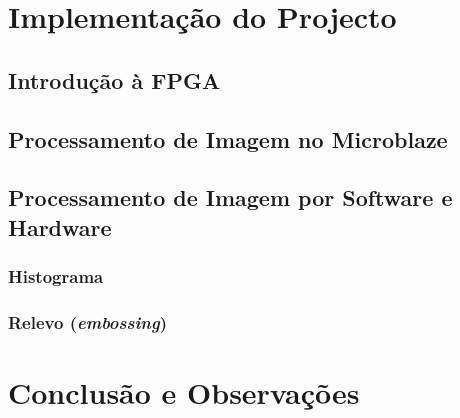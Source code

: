 \documentclass[a4paper]{article}
\begin{document}
\section{Implementação do Projecto}
\subsection{Introdução à FPGA}
\label{subsec:LEDs}

\subsection{Processamento de Imagem no Microblaze\texttrademark}

\subsection{Processamento de Imagem por Software e Hardware}
\subsubsection{Histograma}

\subsubsection{Relevo (\textit{embossing})}

\section{Conclusão e Observações}


\nocite{}
\end{document}
